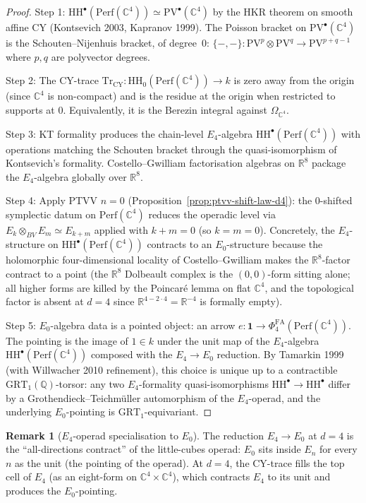 \documentclass[11pt]{article}
\providecommand{\C}{\mathbb{C}}
\providecommand{\R}{\mathbb{R}}
\providecommand{\Perf}{\mathrm{Perf}}
\providecommand{\Efour}{E_4}
\providecommand{\Ezero}{E_0}
\providecommand{\PV}{\mathrm{PV}}
\providecommand{\HH}{\mathrm{HH}}
\providecommand{\PhiFA}{\Phi^{\mathrm{FA}}}
\providecommand{\Tr}{\mathrm{Tr}}
\theoremstyle{definition}
\newtheorem{remark}[theorem]{Remark}
\begin{document}
\begin{proof}
Step 1: $\HH^\bullet(\Perf(\C^4)) \simeq \PV^\bullet(\C^4)$ by the
HKR theorem on smooth affine CY (Kontsevich 2003, Kapranov 1999). The
Poisson bracket on $\PV^\bullet(\C^4)$ is the Schouten--Nijenhuis
bracket, of degree~$0$: $\{-, -\} : \PV^p \otimes \PV^q \to \PV^{p + q - 1}$
where $p, q$ are polyvector degrees.

Step 2: The CY-trace
$\Tr_{\mathrm{CY}} : \HH_0(\Perf(\C^4)) \to k$ is zero away from the origin
(since $\C^4$ is non-compact) and is the residue at the origin when
restricted to supports at $0$. Equivalently, it is the Berezin
integral against $\Omega_{\C^4}$.

Step 3: KT formality produces the chain-level $\Efour$-algebra
$\HH^\bullet(\Perf(\C^4))$ with operations matching the Schouten
bracket through the quasi-isomorphism of Kontsevich's formality.
Costello--Gwilliam factorisation algebras on $\R^8$ package the
$\Efour$-algebra globally over $\R^8$.

Step 4: Apply PTVV $n = 0$ (Proposition~\ref{prop:ptvv-shift-law-d4}):
the $0$-shifted symplectic datum on
$\Perf(\C^4)$ reduces the operadic level via $E_k \otimes_{BV} E_m
\simeq E_{k+m}$ applied with $k + m = 0$ (so $k = m = 0$). Concretely,
the $\Efour$-structure on $\HH^\bullet(\Perf(\C^4))$ contracts
to an $\Ezero$-structure because the holomorphic
four-dimensional locality of Costello--Gwilliam makes the $\R^8$-factor
contract to a point (the $\R^8$ Dolbeault complex is the $(0,0)$-form
sitting alone; all higher forms are killed by the Poincar\'e lemma on
flat $\C^4$, and the topological factor is absent at $d = 4$ since
$\R^{4 - 2 \cdot 4} = \R^{-4}$ is formally empty).

Step 5: $\Ezero$-algebra data is a pointed object: an arrow
$e : \mathbf{1} \to \PhiFA_4(\Perf(\C^4))$. The pointing is the image
of $1 \in k$ under the unit map of the $E_4$-algebra
$\HH^\bullet(\Perf(\C^4))$ composed with the $E_4 \to E_0$ reduction.
By Tamarkin 1999 (with Willwacher 2010 refinement), this choice is
unique up to a contractible
$\mathrm{GRT}_1(\mathbb{Q})$-torsor: any two $E_4$-formality
quasi-isomorphisms
$\HH^\bullet \to \HH^\bullet$ differ by a Grothendieck--Teichm\"uller
automorphism of the $E_4$-operad, and the underlying $E_0$-pointing is
$\mathrm{GRT}_1$-equivariant.
\end{proof}

\begin{remark}[$E_4$-operad specialisation to $E_0$]
\label{rem:E4-to-E0}
The reduction $E_4 \to E_0$ at $d = 4$ is the ``all-directions contract''
of the little-cubes operad: $E_0$ sits inside $E_n$ for every $n$ as the
unit (the pointing of the operad). At $d = 4$, the CY-trace fills
the top cell of $E_4$ (as an eight-form on $\C^4 \times \C^4$), which
contracts $E_4$ to its unit and produces the $E_0$-pointing.
\end{remark}
\end{document}
